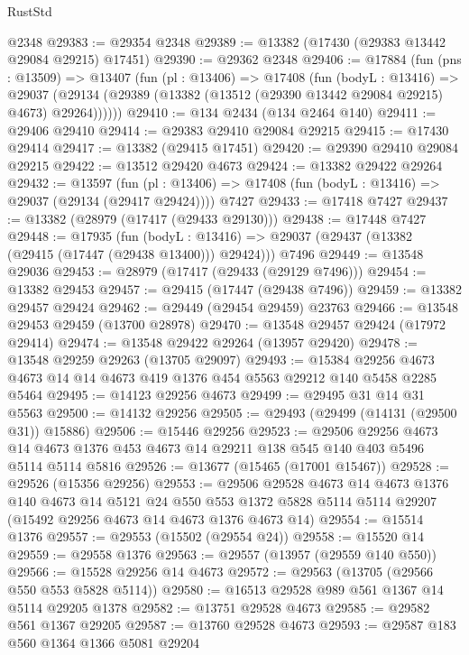 \begin{lexlean}{RustStd}
\begin{coremodule}
    @2348
@29383 := @29354 @2348
@29389 := @13382 (@17430 (@29383 @13442 @29084 @29215) @17451)
@29390 := @29362 @2348
@29406 := @17884
    (fun (pns : @13509) =>
    @13407
      (fun (pl : @13406) =>
      @17408
        (fun (bodyL : @13416) =>
        @29037 (@29134 (@29389 (@13382 (@13512 (@29390 @13442 @29084 @29215) @4673) @29264))))))
@29410 := @134 @2434 (@134 @2464 @140)
@29411 := @29406 @29410
@29414 := @29383 @29410 @29084 @29215
@29415 := @17430 @29414
@29417 := @13382 (@29415 @17451)
@29420 := @29390 @29410 @29084 @29215
@29422 := @13512 @29420 @4673
@29424 := @13382 @29422 @29264
@29432 := @13597
    (fun (pl : @13406) => @17408 (fun (bodyL : @13416) => @29037 (@29134 (@29417 @29424))))
    @7427
@29433 := @17418 @7427
@29437 := @13382 (@28979 (@17417 (@29433 @29130)))
@29438 := @17448 @7427
@29448 := @17935
    (fun (bodyL : @13416) => @29037 (@29437 (@13382 (@29415 (@17447 (@29438 @13400))) @29424)))
    @7496
@29449 := @13548 @29036
@29453 := @28979 (@17417 (@29433 (@29129 @7496)))
@29454 := @13382 @29453
@29457 := @29415 (@17447 (@29438 @7496))
@29459 := @13382 @29457 @29424
@29462 := @29449 (@29454 @29459) @23763
@29466 := @13548 @29453 @29459 (@13700 @28978)
@29470 := @13548 @29457 @29424 (@17972 @29414)
@29474 := @13548 @29422 @29264 (@13957 @29420)
@29478 := @13548 @29259 @29263 (@13705 @29097)
@29493 := @15384
    @29256
    @4673
    @4673
    @14
    @14
    @4673
    @419
    @1376
    @454
    @5563
    @29212
    @140
    @5458
    @2285
    @5464
@29495 := @14123 @29256 @4673
@29499 := @29495 @31 @14 @31 @5563
@29500 := @14132 @29256
@29505 := @29493 (@29499 (@14131 (@29500 @31)) @15886)
@29506 := @15446 @29256
@29523 := @29506
    @29256
    @4673
    @14
    @4673
    @1376
    @453
    @4673
    @14
    @29211
    @138
    @545
    @140
    @403
    @5496
    @5114
    @5114
    @5816
@29526 := @13677 (@15465 (@17001 @15467))
@29528 := @29526 (@15356 @29256)
@29553 := @29506
    @29528
    @4673
    @14
    @4673
    @1376
    @140
    @4673
    @14
    @5121
    @24
    @550
    @553
    @1372
    @5828
    @5114
    @5114
    @29207
    (@15492 @29256 @4673 @14 @4673 @1376 @4673 @14)
@29554 := @15514 @1376
@29557 := @29553 (@15502 (@29554 @24))
@29558 := @15520 @14
@29559 := @29558 @1376
@29563 := @29557 (@13957 (@29559 @140 @550))
@29566 := @15528 @29256 @14 @4673
@29572 := @29563 (@13705 (@29566 @550 @553 @5828 @5114))
@29580 := @16513 @29528 @989 @561 @1367 @14 @5114 @29205 @1378
@29582 := @13751 @29528 @4673
@29585 := @29582 @561 @1367 @29205
@29587 := @13760 @29528 @4673
@29593 := @29587 @183 @560 @1364 @1366 @5081 @29204

\end{coremodule}
\end{lexlean}
